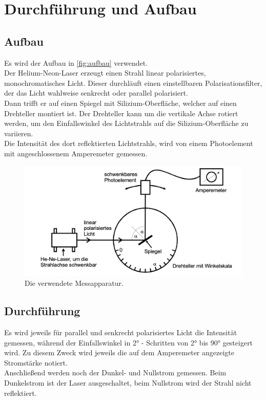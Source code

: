 \section{Durchführung und Aufbau}
\label{sec:Durchführung}

\subsection{Aufbau}

Es wird der Aufbau in \autoref{fig:aufbau} verwendet.\\
Der Helium-Neon-Laser erzeugt einen Strahl linear polarisiertes, monochromatisches Licht.
Dieser durchläuft einen einstellbaren Polarisationsfilter, der das Licht wahlweise senkrecht oder parallel polarisiert. \\
Dann trifft er auf einen Spiegel mit Silizium-Oberfläche, welcher auf einen Drehteller montiert ist.
Der Drehteller kann um die vertikale Achse rotiert werden, um den Einfallswinkel des Lichtstrahls auf die Silizium-Oberfläche 
zu variieren. \\ 
Die Intensität des dort reflektierten Lichtstrahls, wird von einem Photoelement mit angeschlossenem Amperemeter gemessen.\\


\begin{figure}
    \centering
    \includegraphics{content/aufbau}
    \caption{Die verwendete Messapparatur. \cite{sample}}
    \label{fig:aufbau}
  \end{figure}

  \subsection{Durchführung}
  Es wird jeweils für parallel und senkrecht polarisiertes Licht die Intensität gemessen, während der Einfallswinkel in 
  2° - Schritten von 2° bis 90° gesteigert wird. Zu diesem Zweck wird jeweils die auf dem Amperemeter angezeigte Stromstärke notiert.\\
  Anschließend werden noch der Dunkel- und Nullstrom gemessen. Beim Dunkelstrom ist der Laser ausgeschaltet, beim Nullstrom
  wird der Strahl nicht reflektiert.\\